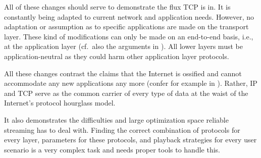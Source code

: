 All of these changes should serve to demonstrate the flux \gls{TCP} is in. It is constantly being adapted to current network and application needs. However, no adaptation or assumption as to specific applications are made on the transport layer. These kind of modifications can only be made on an end-to-end basis, i.e., at the application layer (cf.\ also the arguments in \cite{saltzer1984end2end}). All lower layers must be application-neutral as they could harm other application layer protocols.

All these changes contrast the claims that the Internet is ossified and cannot accommodate any new applications any more (confer for example in \cite{turner2005diversifying}). Rather, \gls{IP} and \gls{TCP} serve as the common carrier of every type of data at the waist of the Internet's protocol hourglass model.

It also demonstrates the difficulties and large optimization space reliable streaming has to deal with. Finding the correct combination of protocols for every layer, parameters for these protocols, and playback strategies for every user scenario is a very complex task and needs proper tools to handle this.











